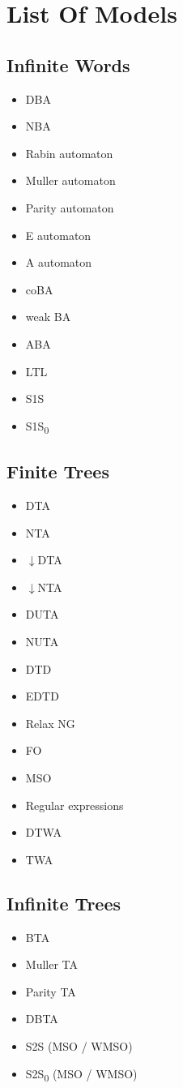 \documentclass{article}
\begin{document}
\section{List Of Models}
\subsection{Infinite Words}
\begin{itemize}
	\item DBA
	\item NBA
	\item Rabin automaton
	\item Muller automaton
	\item Parity automaton
	\item E automaton
	\item A automaton
	\item coBA
	\item weak BA
	\item ABA
	\item LTL
	\item S1S
	\item S1S\textsubscript{0}
\end{itemize}

\subsection{Finite Trees}
\begin{itemize}
	\item DTA
	\item NTA
	\item $\downarrow$DTA
	\item $\downarrow$NTA
	\item DUTA
	\item NUTA
	\item DTD
	\item EDTD
	\item Relax NG
	\item FO
	\item MSO
	\item Regular expressions
	\item DTWA
	\item TWA
\end{itemize}

\subsection{Infinite Trees}
\begin{itemize}
	\item BTA
	\item Muller TA
	\item Parity TA
	\item DBTA
	\item S2S (MSO / WMSO)
	\item S2S\textsubscript{0} (MSO / WMSO)
\end{itemize}
\end{document}
